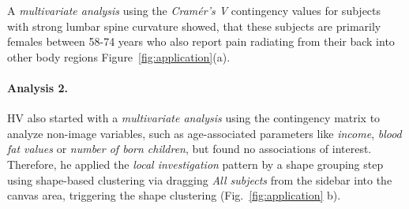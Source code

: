 \documentclass[journal]{style/vgtc} 			          %
\newcommand{\com}[1]{\textcolor{orange}{\uline{#1}}}
\begin{document}
A \emph{multivariate analysis} using the \emph{Cram\'{e}r's V} contingency values for subjects with strong lumbar spine curvature showed, that these subjects are primarily females between 58-74 years who also report pain radiating from their back into other body regions Figure~\ref{fig:application}(a).
%
%
\paragraph{Analysis 2.}
%
HV also started with a \emph{multivariate analysis} using the contingency matrix to analyze non-image variables, such as age-associated parameters like \emph{income}, \emph{blood fat values} or \emph{number of born children}, but found no associations of interest.
%
Therefore, he applied the \emph{local investigation} pattern by a shape grouping step using shape-based clustering via dragging \emph{All subjects} from the sidebar into the canvas area, triggering the shape clustering (Fig.~\ref{fig:application} b).
%
\end{document}

